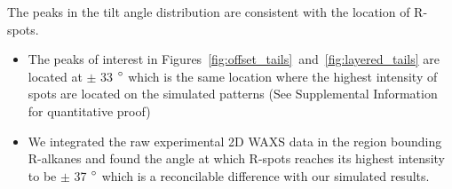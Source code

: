 \documentclass{article}
\begin{document}
  The peaks in the tilt angle distribution are consistent with the location of R-spots.
  \begin{itemize}
	\item The peaks of interest in Figures~\ref{fig:offset_tails}~and~\ref{fig:layered_tails}
	are located at $\pm$ 33 $\degree$ which is the same location where the highest intensity
	of spots are located on the simulated patterns (See Supplemental Information for quantitative proof)
	\item We integrated the raw experimental 2D WAXS data in the region bounding R-alkanes 
        and found the angle at which R-spots reaches its highest intensity to be $\pm$ 37 $\degree$ which 
        is a reconcilable difference with our simulated results.  
  \end{itemize}
\end{document}
